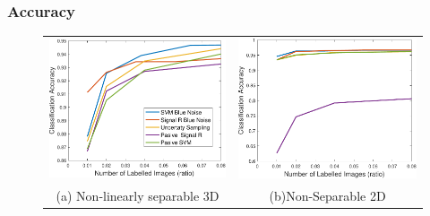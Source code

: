 \documentclass[11pts]{beamer}
\begin{document}
\begin{frame}%
\frametitle{Accuracy}

\begin{figure}[ht]
 \begin{tabular}{cc}
     \includegraphics[scale=0.4]{ACC/ACC3d.pdf} &
    \includegraphics[scale=0.4]{ACC/ERROR_NS.pdf}
   \\
    (a) Non-linearly separable 3D& (b)Non-Separable 2D \\
 \end{tabular}
 \bigskip
 
\end{figure}
\end{frame}
\end{document}
